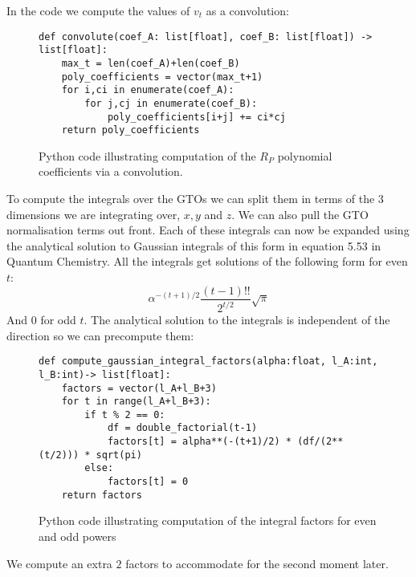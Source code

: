 In the code we compute the values of $v_t$ as a convolution:
\begin{figure}[H]
\begin{verbatim}
def convolute(coef_A: list[float], coef_B: list[float]) -> list[float]:
    max_t = len(coef_A)+len(coef_B)
    poly_coefficients = vector(max_t+1)
    for i,ci in enumerate(coef_A):
        for j,cj in enumerate(coef_B):
            poly_coefficients[i+j] += ci*cj
    return poly_coefficients
\end{verbatim}
    \caption{Python code illustrating computation of the $R_P$ polynomial coefficients via a convolution.}
\end{figure}


To compute the integrals over the GTOs we can split them in terms of the 3 dimensions we are integrating over, $x,y$ and $z$. We can also pull the GTO normalisation terms out front. 
Each of these integrals can now be expanded using the analytical solution to Gaussian integrals of this form in equation 5.53 in Quantum Chemistry\cite{daudel1983}. All the integrals get solutions of the following form for even $t$:
\begin{equation}
    \alpha^{-(t+1)/2}\frac{(t-1)!!}{2^{t/2}}\sqrt{\pi}
\end{equation}
And 0 for odd $t$.
The analytical solution to the integrals is independent of the direction so we can precompute them: 
\begin{figure}[H]
\begin{verbatim}
def compute_gaussian_integral_factors(alpha:float, l_A:int, l_B:int)-> list[float]:
    factors = vector(l_A+l_B+3)
    for t in range(l_A+l_B+3):
        if t % 2 == 0:
            df = double_factorial(t-1)
            factors[t] = alpha**(-(t+1)/2) * (df/(2**(t/2))) * sqrt(pi)
        else:
            factors[t] = 0
    return factors
\end{verbatim}
    \caption{Python code illustrating computation of the integral factors for even and odd powers}
\end{figure}
We compute an extra $2$ factors to accommodate for the second moment later. 

